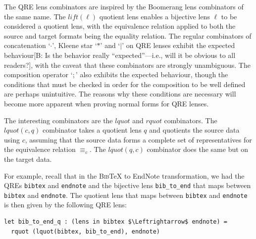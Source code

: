 \documentclass[acmsmall,review,anonymous]{acmart}
\newcommand{\FINISH}[3]{\ifdraft\textcolor{#1}{[#2: #3]}\fi}
\newcommand{\bcp}[1]{\FINISH{dkred}{B}{#1}}
\newcommand{\kw}[1]{\ensuremath{\mathit{#1}}}
\newcommand{\bibtex}{\textsc{Bib}\TeX{}}
\newcommand{\eqrel}[1]{\ensuremath{\equiv_{#1}}}
\newcommand{\cd}[1]{\lstinline[backgroundcolor=\color{white}]$#1$}
\begin{document}
The QRE lens combinators are inspired by the Boomerang lens combinators of the
same name. The $\kw{lift}(\ell)$ quotient lens enables a bijective lens
$\ell$ to be considered a quotient lens, with the equivalence relation applied
to both the source and target formats being the equality relation. The
regular combinators of concatenation `$\cdot$', Kleene star `$*$' and
`$|$' on QRE lenses exhibit the expected behaviour\bcp{Is the behavior really
  ``expected''---i.e., will it be obvious to all readers?}, with the caveat
that these 
combinators are strongly unambiguous. The composition operator `$;$' also
exhibits the expected behaviour, though the conditions that must be checked in
order for the composition to be well defined are perhaps unintuitive. The
reasons why these conditions are necessary will become more apparent when
proving normal forms for QRE lenses.

The interesting combinators are the $\kw{lquot}$ and $\kw{rquot}$
combinators. The $\kw{lquot}(c, q)$ combinator takes a quotient lens $q$ and
quotients the source data using $c$, assuming that the source data forms a
complete set of representatives for the equivalence relation $\eqrel{c}$. The
$\kw{lquot}(q, c)$ combinator does the same but on the target data.

For example, recall that in the \bibtex{} to EndNote transformation, we had the
QREs \cd{bibtex} and \cd{endnote} and the bijective lens \cd{bib_to_end}
that maps between 
\cd{bibtex} and \cd{endnote}. The quotient lens that maps between
\cd{bibtex} and \cd{endnote} is then given by the following QRE lens:

\begin{lstlisting}
let bib_to_end_q : (lens in bibtex $\Leftrightarrow$ endnote) = 
  rquot (lquot(bibtex, bib_to_end), endnote)
\end{lstlisting}

\end{document}
